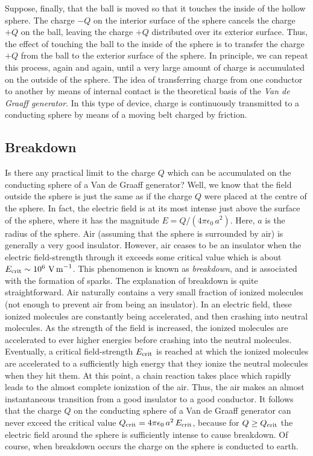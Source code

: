 Suppose, finally,  that the ball is moved so that it touches the inside of the hollow
sphere. The charge $-Q$ on the interior surface of the sphere cancels the
charge $+Q$ on the ball, leaving the charge $+Q$ distributed over 
its exterior surface. Thus, the effect of touching the
ball to the inside of the sphere is to transfer the charge $+Q$ from
the ball to the exterior surface of the sphere. In principle, we
can repeat this process, again and again, until a very large amount of charge
is accumulated on the outside of the
sphere. The idea of transferring charge from one conductor
to another by means of internal contact is the theoretical
 basis of the {\em Van de Graaff
generator}. In this type of device,  charge is continuously transmitted to a conducting sphere by
means of a moving belt charged by friction. 

\subsection{Breakdown}
Is there any practical limit to the charge $Q$ which can be accumulated on the conducting
sphere of a Van de Graaff generator? Well, we know that the field outside the sphere
is just the same as if the charge $Q$ were placed at the centre of the sphere. 
In fact,
the electric field is at its most intense just above the surface of the sphere, where
it has the magnitude $E = Q/(4\pi\epsilon_0\,a^2)$.  Here, $a$ is the radius of
the sphere.  Air (assuming that the sphere is surrounded by air)
is generally a very good insulator. However, air ceases to be an insulator
when the electric field-strength through it exceeds some critical value
which is about $E_{\rm crit} \sim 10^6\,\,{\rm V \,m}^{-1}$. This
phenomenon is known as {\em breakdown}, and is associated with the
formation of sparks. The explanation of breakdown is quite
straightforward. Air naturally contains a very small fraction of
ionized molecules (not enough to prevent air from being an insulator).
In an electric field, these ionized molecules are constantly 
being accelerated, and then crashing into
neutral molecules. As the strength of the field is increased, the ionized molecules
are accelerated to ever higher energies before crashing into the neutral molecules.
Eventually, a critical field-strength $E_{\rm crit}$ is reached at which  the
ionized molecules are accelerated to a sufficiently high  energy that they ionize the neutral
molecules when they hit them. At this point, a chain reaction takes place which
rapidly leads to the almost complete ionization of the air. Thus, the air makes
an almost instantaneous transition from a good insulator to a good conductor. 
It follows that the charge $Q$ on the conducting
sphere of a Van de Graaff generator can never exceed
the critical value $Q_{\rm crit} = 4\pi\epsilon_0\,a^2\, E_{\rm crit}$, because
for $Q\geq Q_{\rm crit}$ the  electric field around the sphere 
is sufficiently intense to
cause breakdown. Of course, when breakdown occurs the charge on the
sphere  is conducted to
earth. 

